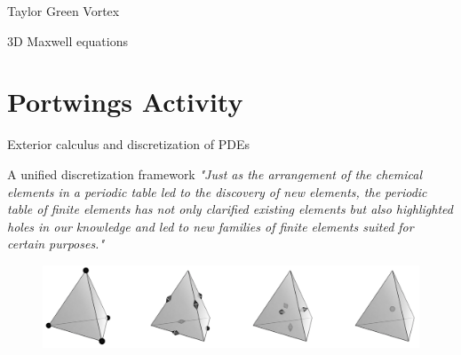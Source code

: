 \documentclass[aspectratio=169]{beamer}
\begin{document}
\begin{frame}{Taylor Green Vortex}
	\begin{center}
	\end{center}

\end{frame}
	
\begin{frame}{3D Maxwell equations}
	\begin{center}
	\end{center}
	
\end{frame}

	
	\section{Portwings Activity}
	
	
	\begin{frame}{Exterior calculus and discretization of PDEs}
		
		\begin{block}{A unified discretization framework}
		\textit{"Just as the arrangement of the chemical elements in a periodic table led to the discovery of new elements, the periodic table of finite elements has not only clarified existing elements but also highlighted holes in our knowledge and led to new families of finite elements suited for certain purposes."}
		\end{block}
	\begin{figure}[t]
			\includegraphics[width=\columnwidth]{Whitney.png}%
	\end{figure}
		
	\end{frame}
	
\end{document}
